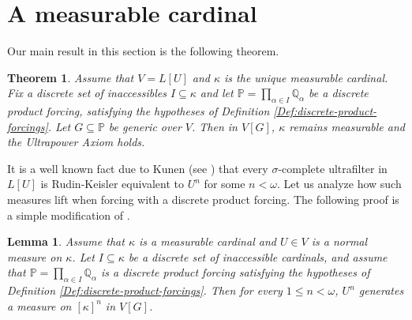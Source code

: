 \documentclass{article}
\theoremstyle{definition}
\theoremstyle{plain}
\newtheorem{theorem}[definition]{Theorem}
\newtheorem{lemma}[definition]{Lemma}
\newcommand{\po}{\mathbb{P}}
\newcommand{\qo}{\mathbb{Q}}
\begin{document}
\section{A measurable cardinal}\label{Sec:Measurable}

Our main result in this section is the following theorem.

\begin{theorem}\label{Thm:ForcingOverLU}
    Assume that $V= L[U]$ and $\kappa$ is the unique measurable cardinal. Fix a discrete set of inaccessibles $I\subseteq \kappa$ and let $\po = \prod_{\alpha\in I}\qo_\alpha$ be a discrete product forcing, satisfying the hypotheses of Definition \ref{Def:discrete-product-forcings}. Let $G\subseteq \po$ be generic over $V$. Then in $V[G]$, $\kappa$ remains measurable and the Ultrapower Axiom holds.
\end{theorem}

It is a well known fact due to Kunen (see \cite{KunenMeasures}) that every $\sigma$-complete ultrafilter in $L[U]$ is Rudin-Keisler equivalent to $U^n$ for some $n<\omega$. Let us analyze how such measures lift when forcing with a discrete product  forcing. The following proof is a simple modification of \cite[Theorem 1.4]{Kaplan}.

\begin{lemma}\label{Lem:LiftsOfPowersOfU}
    Assume that $\kappa$ is a measurable cardinal and $U\in V$ is a normal measure on $\kappa$. Let $I\subseteq \kappa$ be a discrete set of inaccessible cardinals, and assume that $\po = \prod_{\alpha\in I}\qo_\alpha$ is a discrete product forcing satisfying the hypotheses of Definition \ref{Def:discrete-product-forcings}. Then for every $1\leq n<\omega$, $U^n$ generates a measure on $[\kappa]^n$ in $V[G]$.
\end{lemma}
\end{document}
